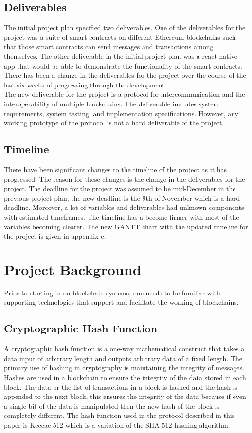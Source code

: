 \documentclass[a4paper,twoside,phd]{BYUPhys}
\begin{document}
\subsection{Deliverables}
The initial project plan specified two deliverables. One of the deliverables for the project was a suite of smart contracts on different Ethereum blockchains such that those smart contracts can send messages and transactions among themselves. The other deliverable in the initial project plan was a react-native app that would be able to demonstrate the functionality of the smart contracts. There has been a change in the deliverables for the project over the course of the last six weeks of progressing through the development. 
\\

The new deliverable for the project is a protocol for intercommunication and the interoperability of multiple blockchains. The deliverable includes system requirements, system testing, and implementation specifications. However, any working prototype of the protocol is not a hard deliverable of the project.
\subsection{Timeline}
There have been significant changes to the timeline of the project as it has progressed. The reason for these changes is the change in the deliverables for the project. The deadline for the project was assumed to be mid-December in the previous project plan; the new deadline is the 9th of November which is a hard deadline. Moreover, a lot of variables and deliverables had unknown components with estimated timeframes. The timeline has a become firmer with most of the variables becoming clearer. The new GANTT chart with the updated timeline for the project is given in appendix c.
\section{Project Background}
Prior to starting in on blockchain systems, one needs to be familiar with supporting technologies that support and facilitate the working of blockchains. 
\subsection{Cryptographic Hash Function}
A cryptographic hash function is a one-way mathematical construct that takes a data input of arbitrary length and outputs arbitrary data of a fixed length. The primary use of hashing in cryptography is maintaining the integrity of messages. Hashes are used in a blockchain to ensure the integrity of the data stored in each block. The data or the list of transactions in a block is hashed and the hash is appended to the next block, this ensures the integrity of the data because if even a single bit of the data is manipulated then the new hash of the block is completely different. The hash function used in the protocol described in this paper is Keccac-512 which is a variation of the SHA-512 hashing algorithm. 
\end{document}
